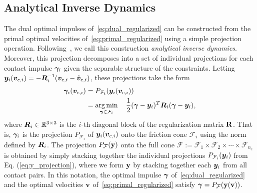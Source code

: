 
\subsection{Analytical Inverse Dynamics}
\label{sec:analytical_inverse_dynamics}

The dual optimal impulses of~\eqref{eq:dual_regularized} can be
constructed from the primal optimal velocities of~\eqref{eq:primal_regularized}
using a simple projection operation. Following~\cite{bib:todorov2014}, we call
this construction  \textit{analytical inverse dynamics}. Moreover, this
projection decomposes into a set of individual projections for each contact
impulse ${\bm\gamma}_i$ given the separable structure of the constraints. Letting
${\bm{y}}_i({\bm{v}}_{c,i}) = -{\bm{R}}_i^{-1}({\bm{v}}_{c,i}-\hat{{\bm{v}}}_{c,i})$,
these projections take the form
\begin{equation}
  \begin{aligned}
	\bgamma_i(\vf{v}_{c,i})&= P_{\mathcal{F}_i}(\vf{y}_i(\vf{v}_{c,i}))\\
	&= \argmin_{\bgamma\in\mathcal{F}_i} \quad 
		\frac{1}{2}(\bgamma-\vf{y}_i)^T\vf{R}_i(\bgamma-\vf{y}_i),\\
	\end{aligned}
	\label{eq:y_projection}
\end{equation}
where ${\bm{R}}_i\in\mathbb{R}^{3\times3}$ is the $i\text{-th}$ diagonal block of
the regularization matrix ${\mathbf{R}}$. That is, ${\bm\gamma}_i$ is the projection
$P_{\mathcal{F}_i}$ of ${\bm{y}}_i({\bm{v}}_{c,i})$ onto the friction cone
$\mathcal{F}_i$ using the norm defined by ${\bm{R}}_i$.
 The projection
$P_{\mathcal{F}}({\mathbf{y}})$ onto the full cone $\mathcal{F} := \mathcal{F}_1
\times \mathcal{F}_2 \times \cdots \times \mathcal{F}_{n_c}$ is obtained by
simply stacking together the individual projections
$P_{\mathcal{F}_i}({\bm{y}}_i)$ from Eq. (\ref{eq:y_projection}), where we form
${\mathbf{y}}$ by stacking together each ${\bm{y}}_i$ from all contact pairs.  In this
notation, the optimal impulse ${\bm\gamma}$ of~\eqref{eq:dual_regularized} and the
optimal velocities ${\mathbf{v}}$ of~\eqref{eq:primal_regularized} satisfy  ${\bm\gamma} =
P_{\mathcal{F}}({\mathbf{y}}({\mathbf{v}}))$.
